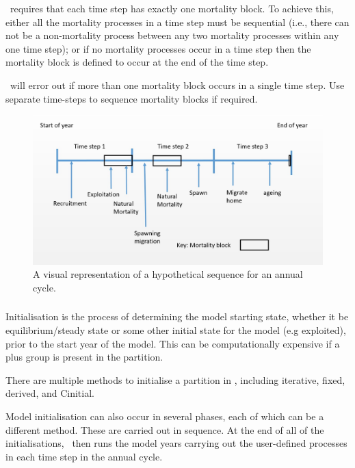 \CNAME\ requires that each time step has exactly one mortality block. To achieve this, either all the mortality processes in a time step must be sequential (i.e., there can not be a non-mortality process between any two mortality processes within any one time step); or if no mortality processes occur in a time step then the mortality block is defined to occur at the end of the time step. 

\CNAME\ will error out if more than one mortality block occurs in a single time step. Use separate time-steps to sequence mortality blocks if required.

\begin{figure}[H]
	\centering
	\includegraphics[scale=0.5]{Figures/annual_cycle.jpg}
	\caption{A visual representation of a hypothetical sequence for an annual cycle.}\label{Fig:annual}
\end{figure}

\subsubsection{}\label{subsec:initialisation}

Initialisation is the process of determining the model starting state, whether it be equilibrium/steady state or some other initial state for the model (e.g exploited), prior to the start year of the model. This can be computationally expensive if a plus group is present in the partition.

There are multiple methods to initialise a partition in \CNAME, including iterative, fixed, derived, and Cinitial. 

Model initialisation can also occur in several phases, each of which can be a different method. These are carried out in sequence. At the end of all of the initialisations, \CNAME\ then runs the model years carrying out the user-defined processes in each time step in the annual cycle.

